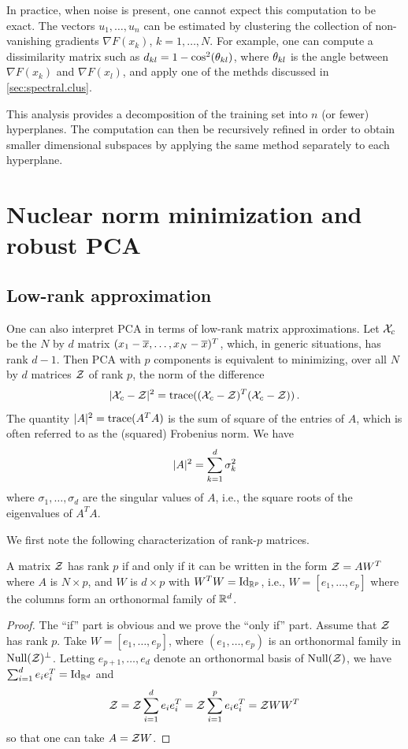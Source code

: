 In practice, when noise is present, one cannot expect this computation to be exact.
The vectors $u_1, \ldots, u_n$ can be estimated by clustering the collection of non-vanishing gradients $\nabla F(x_k)$, $k=1, \ldots, N$. For example, one can compute a dissimilarity matrix such as  
 $d_{kl} = 1 - \cos^2(\theta_{kl})$, where
$\theta_{kl}$ is the angle between $\nabla F(x_k)$ and $\nabla F(x_l)$, and apply one of the methds discussed in   \cref{sec:spectral.clus}.



This analysis provides a decomposition of the training set into $n$
(or fewer) hyperplanes. The computation can then
be recursively refined in order to obtain smaller dimensional subspaces by applying the same method separately to each
hyperplane.

\section{Nuclear norm minimization and robust PCA}
\label{sec:rpca}

\subsection{Low-rank approximation}
One can also interpret PCA in terms of low-rank matrix approximations. Let ${\mathcal X}_c$ be the $N$ by $d$ matrix $(x_1- \overline{x}, \ldots, x_N-\overline{x})^T$, which, in generic situations, has rank $d-1$. Then PCA with $p$ components is equivalent to minimizing, over all $N$ by $d$ matrices ${\mathcal Z}$ of rank $p$, the norm of the difference
\begin{equation}
\label{eq:low.rank.pca}
|{\mathcal X}_c - {\mathcal Z}|^2 = {\mathrm{trace}}(({\mathcal X}_c-{\mathcal Z})^T({\mathcal X}_c-{\mathcal Z}))\,.
\end{equation}
The quantity $|A|^2 = {\mathrm{trace}}(A^TA)$ is the sum of square of the entries of $A$, which is often referred to as the (squared) Frobenius norm. We have
\[
|A|^2 = \sum_{k=1}^d \sigma_k^2
\]
where $\sigma_1, \ldots, \sigma_d$ are the singular values of $A$, i.e., the square roots of the eigenvalues of $A^TA$.

We first note the following characterization of rank-$p$ matrices.
\begin{proposition}
\label{prop.rank.p}
A matrix ${\mathcal Z}$ has rank $p$ if and only if it can be written in the form ${\mathcal Z}  = AW^T$ where $A$ is $N\times p$, and $W$ is $d\times p$ with $W^TW = \Id[p]$, i.e., $W = [e_1, \ldots, e_p]$ where the columns form an orthonormal family of ${\mathbb{R}}^d$.
\end{proposition}
\begin{proof}
The ``if'' part is obvious and we prove the ``only if'' part. Assume that ${\mathcal Z}$ has rank $p$.
Take  $W = [e_1, \ldots, e_p]$, where $(e_1, \ldots, e_p)$ is an orthonormal family in $\mathrm{Null}({\mathcal Z})^\perp$. Letting $e_{p+1}, \ldots, e_d$ denote an orthonormal basis of  $\mathrm{Null}({\mathcal Z})$, we have $\sum_{i=1}^d e_ie_i^T = \Id[d]$ and
\[
{\mathcal Z} = {\mathcal Z}\sum_{i=1}^d e_ie_i^T = {\mathcal Z}\sum_{i=1}^p e_ie_i^T = {\mathcal Z} WW^T
\]
so that one can take $A = {\mathcal Z} W$. 
\end{proof}


